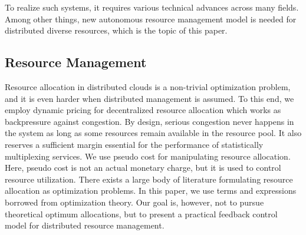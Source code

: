 To realize such systems, it requires various technical advances across
many fields.  Among other things, new autonomous resource management
model is needed for distributed diverse resources,
which is the topic of this paper.

\subsection{Resource Management}

Resource allocation in distributed clouds is a non-trivial
optimization problem, and it is even harder when distributed
management is assumed.
To this end, we employ dynamic pricing for decentralized resource
allocation which works as backpressure against congestion.
By design, serious congestion never happens in the system as long as
some resources remain available in the resource pool.
It also reserves a sufficient margin essential for the performance of
statistically multiplexing services.
We use pseudo cost for manipulating resource allocation.
Here, pseudo cost is not an actual monetary charge, but it is used to
control resource utilization.
There exists a large body of literature formulating resource allocation
as optimization problems.
In this paper, we use terms and expressions borrowed from optimization
theory. Our goal is, however, not to pursue theoretical optimum
allocations, but to present a practical feedback control model for
distributed resource management.


